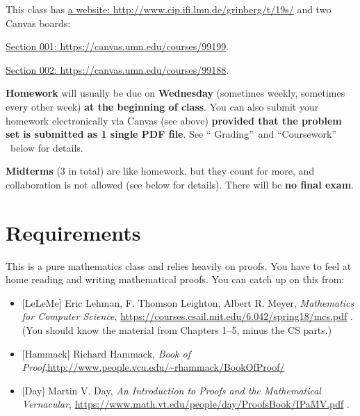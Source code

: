 \documentclass[numbers=enddot,12pt,final,onecolumn,notitlepage]{scrartcl}%
\theoremstyle{definition}
\begin{document}
This class has \href{http://www.cip.ifi.lmu.de/~grinberg/t/19s/}{a website:
http://www.cip.ifi.lmu.de/grinberg/t/19s/} and two Canvas boards:

\qquad\href{https://canvas.umn.edu/courses/99199}{Section 001:
https://canvas.umn.edu/courses/99199}.

\qquad\href{https://canvas.umn.edu/courses/99188}{Section 002:
https://canvas.umn.edu/courses/99188}.

\bigskip

\textbf{Homework} will usually be due on \textbf{Wednesday} (sometimes weekly,
sometimes every other week) \textbf{at the beginning of class}. You can also
submit your homework electronically via Canvas (see above) \textbf{provided
that the problem set is submitted as 1 single PDF file}. See \textquotedblleft
Grading\textquotedblright\ and \textquotedblleft Coursework\textquotedblright%
\ below for details.

\bigskip

\textbf{Midterms} (3 in total) are like homework, but they count for more, and
collaboration is not allowed (see below for details). There will be \textbf{no
final exam}.

\section{Requirements}

This is a pure mathematics class and relies heavily on proofs. You have to
feel at home reading and writing mathematical proofs. You can catch up on this from:

\begin{itemize}
\item {}[LeLeMe] Eric Lehman, F. Thomson Leighton, Albert R. Meyer,
\textit{Mathematics for Computer Science}, \newline%
\url{https://courses.csail.mit.edu/6.042/spring18/mcs.pdf} . (You should know
the material from Chapters 1--5, minus the CS parts.)

\item {}[Hammack] Richard Hammack, \textit{Book of Proof},\newline\url{http://www.people.vcu.edu/~rhammack/BookOfProof/}

\item {}[Day] Martin V. Day, \textit{An Introduction to Proofs and the
Mathematical Vernacular},\newline%
\url{https://www.math.vt.edu/people/day/ProofsBook/IPaMV.pdf} .
\end{itemize}
\end{document}
